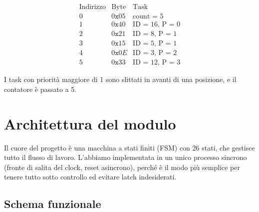 \documentclass[a4paper,12pt]{article}
\begin{document}
\[
\begin{array}{c|c|c}
\text{Indirizzo} & \text{Byte} & \text{Task} \\ \hline
0 & 0\texttt{x}05 & \text{count = 5} \\
1 & 0\texttt{x}40 & \text{ID = 16, P = 0} \\
2 & 0\texttt{x}21 & \text{ID = 8, P = 1}  \\
3 & 0\texttt{x}15 & \text{ID = 5, P = 1}  \\
4 & 0\texttt{x}0E & \text{ID = 3, P = 2}  \\
5 & 0\texttt{x}33 & \text{ID = 12, P = 3}
\end{array}
\]

I task con priorità maggiore di 1 sono slittati in avanti di una posizione, e il contatore è passato a 5.

\newpage
\section{Architettura del modulo}

Il cuore del progetto è una macchina a stati finiti (FSM) con 26 stati, che gestisce tutto il flusso di lavoro. L'abbiamo implementata in un unico processo sincrono (fronte di salita del clock, reset asincrono), perché è il modo più semplice per tenere tutto sotto controllo ed evitare latch indesiderati.

\subsection{Schema funzionale}
\end{document}
